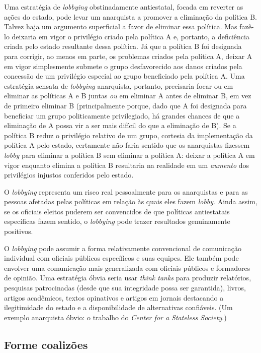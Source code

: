 Uma estratégia de \emph{lobbying} obstinadamente antiestatal, focada em reverter as ações do estado, pode levar um anarquista a promover a eliminação da política B. Talvez haja um argumento superficial a favor de eliminar essa política. Mas fazê-lo deixaria em vigor o privilégio criado pela política A e, portanto, a deficiência criada pelo estado resultante dessa política. Já que a política B foi designada para corrigir, ao menos em parte, os problemas criados pela política A, deixar A em vigor simplesmente submete o grupo desfavorecido aos danos criados pela concessão de um privilégio especial ao grupo beneficiado pela política A. Uma estratégia sensata de \emph{lobbying} anarquista, portanto, precisaria focar ou em eliminar as políticas A e B juntas \emph{ou} em eliminar A antes de eliminar B, em vez de primeiro eliminar B (principalmente porque, dado que A foi designada para beneficiar um grupo politicamente privilegiado, há grandes chances de que a eliminação de A possa vir a ser mais difícil do que a eliminação de B). Se a política B reduz o privilégio relativo de um grupo, cortesia da implementação da política A pelo estado, certamente não faria sentido que os anarquistas fizessem \emph{lobby} para eliminar a política B sem eliminar a política A: deixar a política A em vigor enquanto elimina a política B resultaria na realidade em um \emph{aumento} dos privilégios injustos conferidos pelo estado.

O \emph{lobbying} representa um risco real pessoalmente para os anarquistas e para as pessoas afetadas pelas políticas em relação às quais eles fazem \emph{lobby}. Ainda assim, se os oficiais eleitos puderem ser convencidos de que políticas antiestatais específicas fazem sentido, o \emph{lobbying} pode trazer resultados genuinamente positivos.

O \emph{lobbying} pode assumir a forma relativamente convencional de comunicação individual com oficiais públicos específicos e suas equipes. Ele também pode envolver uma comunicação mais generalizada com oficiais públicos e formadores de opinião. Uma estratégia óbvia seria usar \emph{think tanks} para produzir relatórios, pesquisas patrocinadas (desde que sua integridade possa ser garantida), livros, artigos acadêmicos, textos opinativos e artigos em jornais destacando a ilegitimidade do estado e a disponibilidade de alternativas confiáveis. (Um exemplo anarquista óbvio: o trabalho do \emph{Center for a Stateless Society}.)

\subsection*{Forme coalizões}

